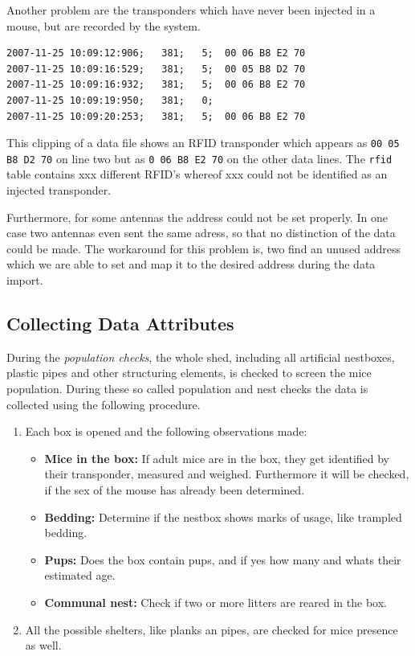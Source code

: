 Another problem are the transponders which have never been injected in a mouse, but are recorded by the system. 

\numcodestyle
\begin{lstlisting}[frame=none]
2007-11-25 10:09:12:906;   381;   5;  00 06 B8 E2 70
2007-11-25 10:09:16:529;   381;   5;  00 05 B8 D2 70
2007-11-25 10:09:16:932;   381;   5;  00 06 B8 E2 70
2007-11-25 10:09:19:950;   381;   0; 
2007-11-25 10:09:20:253;   381;   5;  00 06 B8 E2 70
\end{lstlisting}   

This clipping of a data file shows an \ac{RFID} transponder which appears as \lstinline|00 05 B8 D2 70| on line two but as \lstinline|0 06 B8 E2 70| on the other data lines. The \lstinline|rfid| table contains xxx different \ac{RFID}'s whereof xxx could not be identified as an injected transponder.   

Furthermore, for some antennas the address could not be set properly. In one case two antennas even sent the same adress, so that no distinction of the data could be made. The workaround for this problem is, two find an unused address which we are able to set and map it to the desired address during the data import.   

\subsection{Collecting Data Attributes}
\label{subsec:dataattr}

During the \textit{population checks}, the whole shed, including all artificial nestboxes, plastic pipes and other structuring elements, is checked to screen the mice population. During these so called population and nest checks the data is collected using the following procedure.

\begin{enumerate} 
	\item Each box is opened and the following observations made:
	\begin{itemize}
      \item \textbf{Mice in the box:} If adult mice are in the box, they get identified by their transponder, measured and weighed. Furthermore it will be checked, if the sex of the mouse has already been determined.  
      \item \textbf{Bedding:} Determine if the nestbox shows marks of usage, like trampled bedding.
      \item \textbf{Pups:} Does the box contain pups, and if yes how many and whats their estimated age. 
      \item \textbf{Communal nest:} Check if two or more litters are reared in the box. 
    \end{itemize}
	\item All the possible shelters, like planks an pipes, are checked for mice presence as well.
\end{enumerate}

